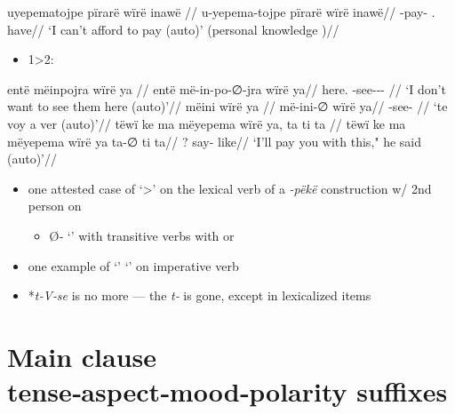 \documentclass{memoir}
\begin{document}
\ex \label{1sub}
\begingl \glpreamble uyepematojpe pïrarë wïrë inawë //
\gla u-yepema-tojpe pïrarë wïrë inawë//
\glb {}-pay- .  have//
\glft ‘I can't afford to pay (auto)’ (personal knowledge
)//
\endgl
\xe

\begin{itemize}
\tightlist
\item
  1\textgreater2:
\end{itemize}

\pex\label{}    \a     \label{convfemgrme-231}        \begingl
       \glpreamble entë mëinpojra wïrë ya //
       \gla entë më-in-po-∅-jra wïrë ya//
       \glb here. -see---  //
           \glft ‘I don't want to see them here (auto)’//  
       \endgl 
   \a     \label{convfemgrme-232}        \begingl
       \glpreamble mëini wïrë ya //
       \gla më-ini-∅ wïrë ya//
       \glb {}-see-  //
           \glft ‘te voy a ver (auto)’//  
       \endgl 
   \a     \label{ctovarmafl-283}        \begingl
       \glpreamble tëwï ke ma mëyepema wïrë ya, ta ti ta //
       \gla tëwï ke ma mëyepema wïrë ya ta-∅ ti ta//
       \glb {}   ?   say-  like//
           \glft ‘I'll pay you with this," he said (auto)’//  
       \endgl 
\xe

\begin{itemize}
\item
  one attested case of  `\textgreater{}' on the
  lexical verb of a \emph{-pëkë} construction w/ 2nd person  on

  \begin{itemize}
  \tightlist
  \item
    Ø‑ `' with transitive verbs with  or
  \end{itemize}
\item
  one example of  `' `' on imperative verb
\item
  *\emph{t‑V‑se} is no more --- the \emph{t‑} is gone, except in
  lexicalized items
\end{itemize}

\section{\texorpdfstring{Main clause tense‑aspect‑mood‑polarity suffixes
\label{sec:tam}}{Main clause tense‑aspect‑mood‑polarity suffixes }}
\end{document}

